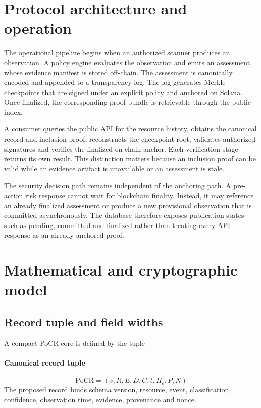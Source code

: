 \documentclass[10pt,a4paper]{article}
\begin{document}
\section*{Protocol architecture and operation}
The operational pipeline begins when an authorized scanner produces an observation. A policy engine evaluates the observation and emits an assessment, whose evidence manifest is stored off-chain. The assessment is canonically encoded and appended to a transparency log. The log generates Merkle checkpoints that are signed under an explicit policy and anchored on Solana. Once finalized, the corresponding proof bundle is retrievable through the public index.


A consumer queries the public API for the resource history, obtains the canonical record and inclusion proof, reconstructs the checkpoint root, validates authorized signatures and verifies the finalized on-chain anchor. Each verification stage returns its own result. This distinction matters because an inclusion proof can be valid while an evidence artifact is unavailable or an assessment is stale.


The security decision path remains independent of the anchoring path. A pre-action risk response cannot wait for blockchain finality. Instead, it may reference an already finalized assessment or produce a new provisional observation that is committed asynchronously. The database therefore exposes publication states such as pending, committed and finalized rather than treating every API response as an already anchored proof.


\section*{Mathematical and cryptographic model}
\subsection*{Record tuple and field widths}
A compact PoCR core is defined by the tuple


\paragraph{Canonical record tuple}
\[\boxed{\mathrm{PoCR}=(v,R,E,D,C,t,H_e,P,N)}\]
The proposed record binds schema version, resource, event, classification, confidence, observation time, evidence, provenance and nonce.
\end{document}
